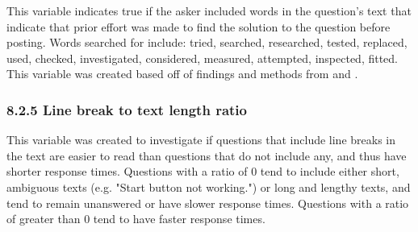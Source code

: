 \documentclass{article}
\begin{document}
This variable indicates true if the asker included words in the question's text that indicate that prior effort was made to find the solution to the question before posting. Words searched for include: tried, searched, researched, tested, replaced, used, checked, investigated, considered, measured, attempted, inspected, fitted. This variable was created based off of findings and methods from \citep{Bhat2014} and \citep{Harper2008}. 


\subsubsection*{8.2.5 Line break to text length ratio}

This variable was created to investigate if questions that include line breaks in the text are easier to read than questions that do not include any, and thus have shorter response times. Questions with a ratio of 0 tend to include either short, ambiguous texts (e.g. "Start button not working.") or long and lengthy texts, and tend to remain unanswered or have slower response times. Questions with a ratio of greater than 0 tend to have faster response times. 





\end{document}
